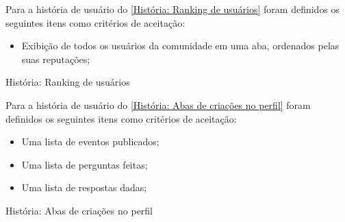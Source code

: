 Para a história de usuário do \autoref{História: Ranking de usuários} foram definidos os seguintes itens como critérios de aceitação:

\begin{itemize}
\item Exibição de todos os usuários da comunidade em uma aba, ordenados pelas suas reputações;
\end{itemize}

\def\arraystretch{2}
\begin{quadro}[htb]
\centering
\ABNTEXfontereduzida
\caption[História: Ranking de usuários]{História: Ranking de usuários}
\label{História: Ranking de usuários}
\end{quadro}
\FloatBarrier 

Para a história de usuário do \autoref{História: Abas de criações no perfil} foram definidos os seguintes itens como critérios de aceitação:

\begin{itemize}
\item Uma lista de eventos publicados;
\item Uma lista de perguntas feitas;
\item Uma lista de respostas dadas;
\end{itemize}

\def\arraystretch{2}
\begin{quadro}[htb]
\centering
\ABNTEXfontereduzida
\caption[História: Abas de criações no perfil]{História: Abas de criações no perfil}
\label{História: Abas de criações no perfil}
\end{quadro}
\FloatBarrier 

